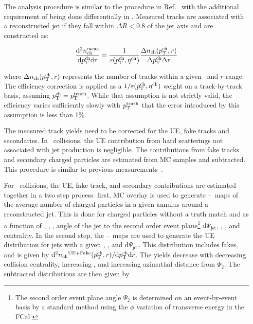 
The analysis procedure is similar to the procedure in Ref.~\cite{Aaboud:2018hpb} with the additional requirement of being done differentially in \rvar. Measured tracks are associated with a reconstructed jet if they fall within $\Delta R < 0.8$ of the jet axis and are constructed as:

\begin{align*}
\dfrac{\mathrm{d}^{2} \mbox{$n_{\mathrm{ch}}^{\mathrm{meas}}$} }{ \mathrm{d} \mbox{$p_{\mathrm{T}}^{\mathrm{ch}}$} \mathrm{d} r} = \frac{1}{\varepsilon(\mbox{$p_{\mathrm{T}}^{\mathrm{ch}}$},\mbox{$\eta^{\mathrm{ch}}$})} \frac{\Delta \mbox{$n_{\mathrm{ch}}$}( \mbox{$p_{\mathrm{T}}^{\mathrm{ch}}$}, r)}{ \Delta\mbox{$p_{\mathrm{T}}^{\mathrm{ch}}$} \Delta r}
\end{align*}

where $\Delta \mbox{$n_{\mathrm{ch}}$} (\mbox{$p_{\mathrm{T}}^{\mathrm{ch}}$}, r)$ represents the number of tracks within a given \pttrk\ and $r$ range. The efficiency correction is applied as a $1/\varepsilon(\mbox{$p_{\mathrm{T}}^{\mathrm{ch}}$},\mbox{$\eta^{\mathrm{ch}}$})$ weight on a track-by-track basis, assuming $\mbox{$p_{\mathrm{T}}^{\mathrm{ch}}$} = \mbox{$p_{\mathrm{T}}^{\mathrm{truth}}$}$. While that assumption is not strictly valid, the efficiency varies sufficiently slowly with $\mbox{$p_{\mathrm{T}}^{\mathrm{truth}}$}$ that the error
introduced by this assumption is less than 1\%.

The measured track yields need to be corrected for the UE, fake tracks and secondaries. In \pp\ collisions, the UE contribution from hard scatterings not associated with jet production is negligible. The contributions from fake tracks and secondary charged particles are estimated from MC samples and subtracted. This procedure is similar to previous measurements~\cite{Aaboud:2017tke,Aaboud:2018hpb}.

For \pbpb\ collisions, the UE, fake track, and secondary contributions are estimated together in a two step process: first, MC overlay is used to generate \etajet--\phijet\ maps of the average number of charged particles in a given annulus around a reconstructed jet. This is done for charged particles without a truth match and as a function of \ptjet, \etajet, \phijet, angle of the jet to the second order event plane\footnote{The second order event plane angle $\Psi_2$ is determined on an event-by-event basis by a standard method using the $\phi$ variation of transverse energy in the FCal \cite{ATLAS:2012at}} $ \mathrm{d}\Psi_{\mathrm{jet}}$, \rvar, \pttrk, and centrality. In the second step, the \etajet--\phijet\ maps are used to generate the UE distribution for jets with a given \etajet, \phijet, and $\mathrm{d}\Psi_{\mathrm{jet}}$. This distribution includes fakes, and is given by \mbox{$\mathrm{d}^2 \mbox{$n_{\mathrm{ch}}$}^{\mathrm{UE+Fake}}(\mbox{$p_{\mathrm{T}}^{\mathrm{ch}}$}, r) / \mathrm{d} \mbox{$p_{\mathrm{T}}^{\mathrm{ch}}$} \mathrm{d} r$}. The yields decrease with decreasing collision centrality, increasing \pttrk, and increasing azimuthal distance from $\Psi_2$. The subtracted distributions are then given by 

